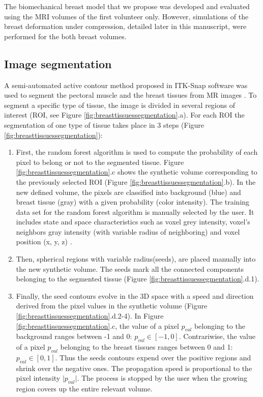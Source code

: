 The biomechanical breast model that we propose was developed and evaluated using the MRI volumes of the first volunteer only. However, simulations of the breast deformation under compression, detailed later in this manuscript,  were performed for the both breast volumes. 
\subsection{Image segmentation}%

A semi-automated active contour method proposed in ITK-Snap software was used to segment the pectoral muscle and the breast tissues from MR images \citep{yushkevich_user_2006}. To segment a specific type of tissue, the image is divided in several regions of interest (ROI, see Figure \ref{fig:breasttissuessegmentation}.a). For each ROI the segmentation of one type of tissue takes place in 3 steps (Figure \ref{fig:breasttissuessegmentation}):
\begin{enumerate}
\item First, the random forest algorithm \citep{ho_random_1995} is used to compute the probability of each pixel to belong or not to the segmented tissue. Figure \ref{fig:breasttissuessegmentation}.c shows the synthetic volume corresponding to the previously selected ROI (Figure \ref{fig:breasttissuessegmentation}.b). In the new defined volume, the pixels are classified into background (blue) and breast tissue (gray) with a given probability (color intensity). The training data set for the random forest algorithm is manually selected by the user. It includes state and space characteristics such as voxel grey intensity, voxel's neighbors gray intensity (with variable radius of neighboring) and voxel position (x, y, z) . 

\item Then, spherical regions with variable radius(seeds), are placed manually into the new synthetic volume. The seeds mark all the connected components belonging to the segmented tissue (Figure \ref{fig:breasttissuessegmentation}.d.1).

\item Finally, the seed contours evolve in the 3D space with a speed and direction derived from the pixel values in the synthetic volume (Figure \ref{fig:breasttissuessegmentation}.d.2-4). In Figure \ref{fig:breasttissuessegmentation}.c, the value of a pixel $p_{val}$ belonging to the background ranges between -1 and 0: $p_{val} \in [-1,0]$. Contrariwise, the value of a pixel $p_{val}$ belonging to the breast tissues ranges between 0 and 1: $p_{val} \in [0,1]$. Thus the seeds contours expend over the positive regions and shrink over the negative ones. The propagation speed is proportional to the pixel intensity $\vert p_{val} \vert$. The process is stopped by the user when the growing region covers up the entire relevant volume.  
\end{enumerate}

